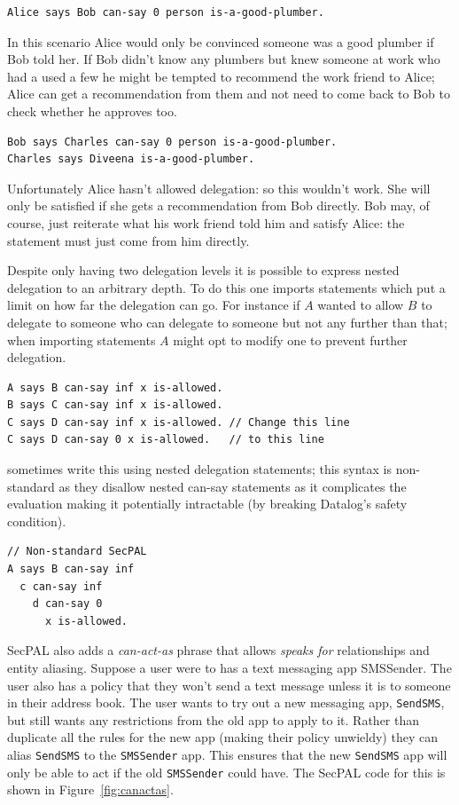 \documentclass[a4paper]{article}
\begin{document}
\begin{lstlisting}[language=SecPAL]
Alice says Bob can-say 0 person is-a-good-plumber.
\end{lstlisting}

In this scenario Alice would only be convinced someone was a good plumber if Bob
told her.  If Bob didn't know any plumbers but knew someone at work who had a
used a few he might be tempted to recommend the work friend to Alice; Alice can
get a recommendation from them and not need to come back to Bob to check whether
he approves too.

\begin{lstlisting}[language=SecPAL]
Bob says Charles can-say 0 person is-a-good-plumber.
Charles says Diveena is-a-good-plumber.
\end{lstlisting}

Unfortunately Alice hasn't allowed delegation: so this wouldn't work.  She will
only be satisfied if she gets a recommendation from Bob directly.  Bob may, of
course, just reiterate what his work friend told him and satisfy Alice: the
statement must just come from him directly.

Despite only having two delegation levels it is possible to express nested
delegation to an arbitrary depth.  To do this one imports statements which put a
limit on how far the delegation can go.  For instance if $A$ wanted to allow $B$
to delegate to someone who can delegate to someone but not any further than
that; when importing statements $A$ might opt to modify one to prevent further
delegation.

\begin{lstlisting}[language=SecPAL]
A says B can-say inf x is-allowed.
B says C can-say inf x is-allowed. 
C says D can-say inf x is-allowed. // Change this line
C says D can-say 0 x is-allowed.   // to this line
\end{lstlisting}

\citeauthor{Becker:2006vh} sometimes write this using nested delegation
statements; this syntax is non-standard as they disallow nested can-say
statements as it complicates the evaluation making it potentially intractable
(by breaking Datalog's safety condition).

\begin{lstlisting}[language=SecPAL]
// Non-standard SecPAL
A says B can-say inf 
  c can-say inf
    d can-say 0 
      x is-allowed.
\end{lstlisting}

{SecPAL} also adds a \emph{can-act-as} phrase that allows \emph{speaks for}
relationships and entity aliasing.  Suppose a user were to has a text messaging
app SMSSender.  The user also has a policy that they won't send a text message
unless it is to someone in their address book.  The user wants to try out a new
messaging app, \texttt{SendSMS}, but still wants any restrictions from the old
app to apply to it.  Rather than duplicate all the rules for the new app (making
their policy unwieldy) they can alias \texttt{SendSMS} to the \texttt{SMSSender}
app.  This ensures that the new \texttt{SendSMS} app will only be able to act if
the old \texttt{SMSSender} could have. The SecPAL code for this is shown in
Figure~\ref{fig:canactas}.
\end{document}
